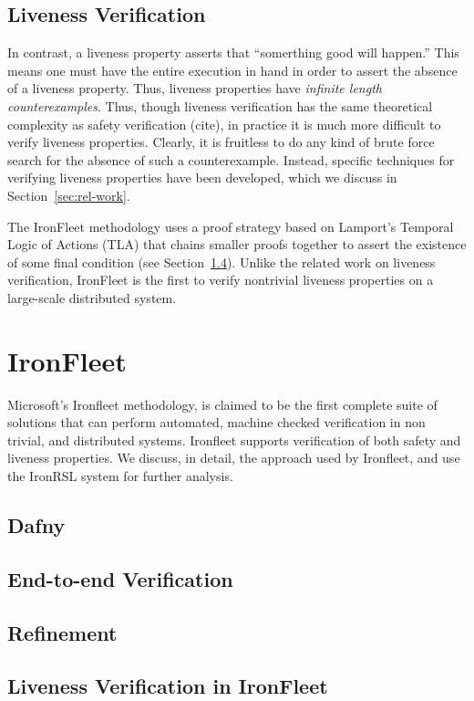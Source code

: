 \documentclass{llncs}
\begin{document}
\subsection{Liveness Verification}
In contrast, a liveness property asserts that ``somerthing good will happen.''
This means one must have the entire execution in hand in order to assert the
absence of a liveness property. Thus, liveness properties have
\textit{infinite length counterexamples}.
Thus, though liveness verification has the same theoretical complexity as safety
verification (cite), in practice it is much more difficult to verify liveness
properties. Clearly, it is fruitless to do any kind of brute force search for
the absence of such a counterexample. Instead, specific techniques for verifying
liveness properties have been developed, which we discuss in
Section~\ref{sec:rel-work}.

The IronFleet methodology uses a proof strategy based on Lamport's Temporal
Logic of Actions (TLA) that chains smaller proofs together to assert the
existence of some final condition (see
Section~\ref{sec:liveness-ironfleet}). Unlike the related work on liveness
verification, IronFleet is the first to verify nontrivial liveness properties on
a large-scale distributed system.
%
\section{IronFleet}
Microsoft's Ironfleet methodology, is claimed to be the first complete suite of 
solutions that can perform automated, machine checked verification 
in non trivial, and distributed systems. Ironfleet supports 
verification of both safety and liveness properties. We discuss, in detail, the 
approach used by Ironfleet, and use the IronRSL system for further analysis.
\subsection{Dafny}
\subsection{End-to-end Verification}
\subsection{Refinement}
\subsection{Liveness Verification in IronFleet}\label{sec:liveness-ironfleet}
\end{document}
